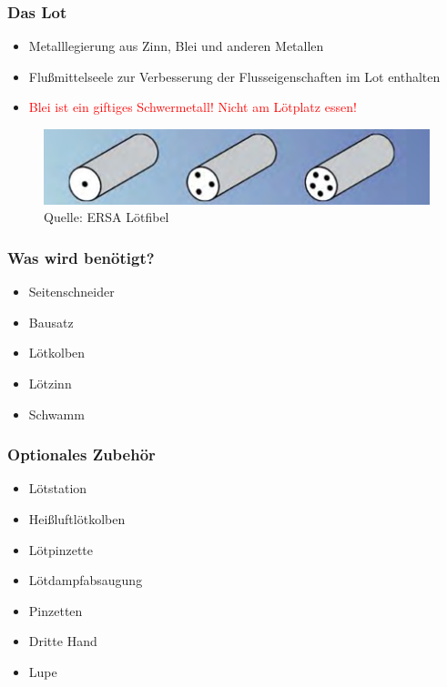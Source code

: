 \documentclass[10pt]{beamer}
\begin{document}
	\begin{frame}
	\frametitle{Das Lot}
	\begin{itemize}
		\item{Metalllegierung aus Zinn, Blei und anderen Metallen}
		\item{Flußmittelseele zur Verbesserung der Flusseigenschaften im Lot enthalten}
		\item{\textcolor{red}{Blei ist ein giftiges Schwermetall! Nicht am Lötplatz essen!}}
	\end{itemize}
	\begin{figure}[hbtp]
		\centering
		\includegraphics[width=\linewidth]{images/lotseele.png}
		\caption{Quelle: ERSA Lötfibel}
	\end{figure}
	\end{frame}

	\begin{frame}
	\frametitle{Was wird benötigt?}
	\begin{itemize}
		\item{Seitenschneider}
		\item{Bausatz}
		\item{Lötkolben}
		\item{Lötzinn}
		\item{Schwamm}
	\end{itemize}
	\end{frame}

	\begin{frame}
	\frametitle{Optionales Zubehör}
	\begin{itemize}
		\item{Lötstation}
		\item{Heißluftlötkolben}
		\item{Lötpinzette}
		
		\item{Lötdampfabsaugung}
		
		\item{Pinzetten}
		\item{Dritte Hand}
		\item{Lupe}
	\end{itemize}
	\end{frame}
\end{document}
